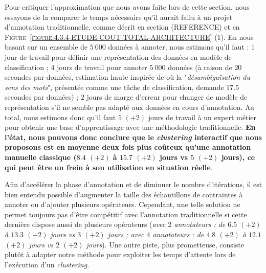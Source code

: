 			Pour critiquer l'approximation que nous avons faite lors de cette section, nous essayons de la comparer le temps nécessaire qu'il aurait fallu à un projet d'annotation traditionnelle, comme décrit en section (REFERENCE) et en \textsc{Figure~\ref{figure:4.3.4-ETUDE-COUT-TOTAL-ARCHITECTURE}} (1).
			En nous basant sur un ensemble de $5~000$ données à annoter, nous estimons qu'il faut :
			$1$ jour de travail pour définir une représentation des données en modèle de classification ;
			$4$ jours de travail pour annoter $5~000$ données (à raison de $20$ secondes par données, estimation haute inspirée de \cite{pradhan-etal:2007:semeval2007-task-17} où la "\textit{désambiguïsation du sens des mots}", présentée comme une tâche de classification, demande $17.5$ secondes par données) ;
			$2$ jours de marge d'erreur pour changer de modèle de représentation s'il ne semble pas adapté aux données en cours d'annotation.
			Au total, nous estimons donc qu'il faut $5$ {\footnotesize $(+2)$} jours de travail à un expert métier pour obtenir une base d'apprentissage avec une méthodologie traditionnelle.
			\textbf{En l'état, nous pouvons donc conclure que le \textit{clustering} interactif que nous proposons est en moyenne deux fois plus coûteux qu'une annotation manuelle classique ($8.4$ {\footnotesize $(+2)$} à $15.7$ {\footnotesize $(+2)$} jours vs $5$ {\footnotesize $(+2)$} jours), ce qui peut être un frein à son utilisation en situation réelle}.
			
			Afin d'accélérer la phase d'annotation et de diminuer le nombre d'itérations, il est bien entendu possible d'augmenter la taille des échantillons de contraintes à annoter ou d'ajouter plusieurs opérateurs.
			Cependant, une telle solution ne permet toujours pas d'être compétitif avec l'annotation traditionnelle si cette dernière dispose aussi de plusieurs opérateurs (\textit{avec $2$ annotateurs : de $6.5$ {\footnotesize $(+2)$} à $13.3$ {\footnotesize $(+2)$} jours vs $3$ {\footnotesize $(+2)$} jours ; avec $4$ annotateurs : de $4.8$ {\footnotesize $(+2)$} à $12.1$ {\footnotesize $(+2)$} jours vs $2$ {\footnotesize $(+2)$} jours}).
			Une autre piste, plus prometteuse, consiste plutôt à adapter notre méthode pour exploiter les temps d'attente lors de l'exécution d'un \textit{clustering}.
			

